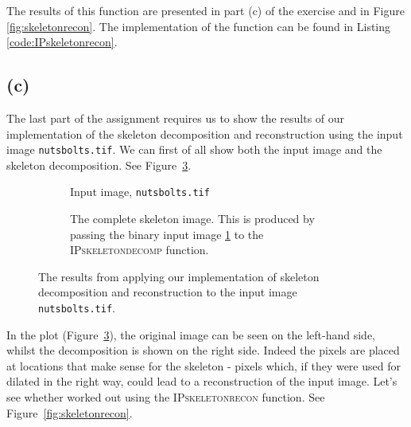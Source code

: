 \documentclass{article}
\begin{document}
The results of this function are presented in part (c) of the exercise and in Figure \ref{fig:skeletonrecon}. The implementation of the function can be found in  Listing \ref{code:IPskeletonrecon}.

\subsection*{(c)}
The last part of the assignment requires us to show the results of our implementation of the skeleton decomposition and reconstruction using the input image \texttt{nutsbolts.tif}. We can first of all show both the input image and the skeleton decomposition. See Figure~\ref{fig:skeletondecomp}.

\begin{figure}[H]
     \centering
     \begin{subfigure}[t]{0.45\textwidth}
         \centering
         
         \caption{Input image, \texttt{nutsbolts.tif}}
         \label{fig:skeletondecomp_input}
     \end{subfigure}
     \hfill
     \begin{subfigure}[t]{0.45\textwidth}
         \centering
         
         \caption{The complete skeleton image. This is produced by passing the binary input image \ref{fig:skeletondecomp_input} to the \textsc{IPskeletondecomp} function.}
         \label{fig:skeletondecomp_skeleton}
     \end{subfigure}
    \caption{The results from applying our implementation of skeleton decomposition and reconstruction to the input image \texttt{nutsbolts.tif}.}
    \label{fig:skeletondecomp}
\end{figure}

In the plot (Figure~\ref{fig:skeletondecomp}), the original image can be seen on the left-hand side, whilst the decomposition is shown on the right side. Indeed the pixels are placed at locations that make sense for the skeleton - pixels which, if they were used for dilated in the right way, could lead to a reconstruction of the input image. Let's see whether worked out using the \textsc{IPskeletonrecon} function. See Figure~\ref{fig:skeletonrecon}.
\end{document}
